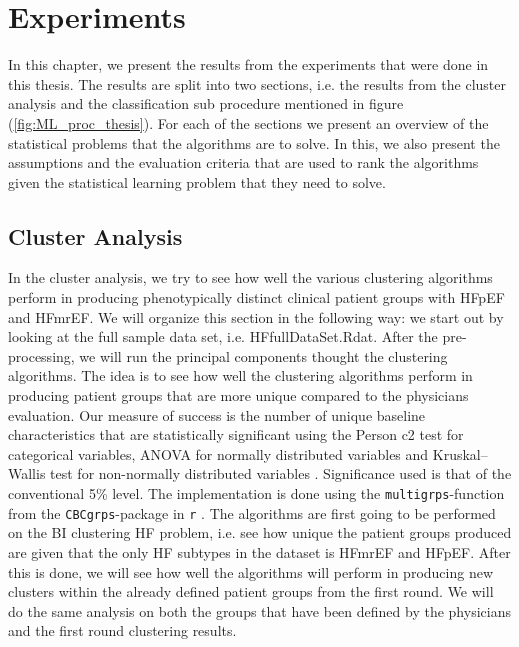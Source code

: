 \documentclass[../thesis.tex]{subfiles}
\begin{document}
\chapter{Experiments}
\label{chap:exp}

\noindent In this chapter, we present the results from the experiments that were done in this thesis. The results are split into two sections, i.e. the results from the cluster analysis and the classification sub procedure mentioned in figure (\ref{fig:ML_proc_thesis}). For each of the sections we present an overview of the statistical problems that the algorithms are to solve. In this, we also present the assumptions and the evaluation criteria that are used to rank the algorithms given the statistical learning problem that they need to solve. 

\section{Cluster Analysis}

\noindent In the cluster analysis, we try to see how well the various clustering algorithms perform in producing phenotypically distinct clinical patient groups with HFpEF and HFmrEF. We will organize this section in the following way: we start out by looking at the full sample data set, i.e. HFfullDataSet.Rdat. After the pre-processing, we will run the principal components thought the clustering algorithms. The idea is to see how well the clustering algorithms perform in producing patient groups that are more unique compared to the physicians evaluation. Our measure of success is the number of unique baseline characteristics that are statistically significant using the Person c2 test for categorical variables, ANOVA for normally distributed variables and Kruskal–Wallis test for non-normally distributed variables \citep{kruskal1952use}. Significance
used is that of the conventional 5\% level. The implementation is done using the \texttt{multigrps}-function from the \texttt{CBCgrps}-package in \texttt{r} \citep{CBCgrps}. The algorithms are first going to be performed on the BI clustering HF problem, i.e. see how unique the patient groups produced are given that the only HF subtypes in the dataset is HFmrEF and HFpEF. After this is done, we will see how well the algorithms will perform in producing new clusters within the already defined patient groups from the first round. We will do the same analysis on both the groups that have been defined by the physicians and the first round clustering results.
\end{document}
